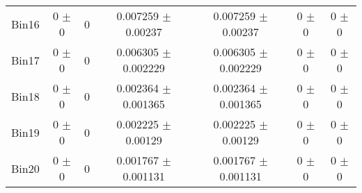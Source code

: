 \begin{tabular}{@{\extracolsep{4pt}}lcccccc@{}}
     Bin16 & 0 $\pm$ 0 & 0 & 0.007259 $\pm$ 0.00237 & 0.007259 $\pm$ 0.00237 & 0 $\pm$ 0 & 0 $\pm$ 0 \\ 
     Bin17 & 0 $\pm$ 0 & 0 & 0.006305 $\pm$ 0.002229 & 0.006305 $\pm$ 0.002229 & 0 $\pm$ 0 & 0 $\pm$ 0 \\ 
     Bin18 & 0 $\pm$ 0 & 0 & 0.002364 $\pm$ 0.001365 & 0.002364 $\pm$ 0.001365 & 0 $\pm$ 0 & 0 $\pm$ 0 \\ 
     Bin19 & 0 $\pm$ 0 & 0 & 0.002225 $\pm$ 0.00129 & 0.002225 $\pm$ 0.00129 & 0 $\pm$ 0 & 0 $\pm$ 0 \\ 
     Bin20 & 0 $\pm$ 0 & 0 & 0.001767 $\pm$ 0.001131 & 0.001767 $\pm$ 0.001131 & 0 $\pm$ 0 & 0 $\pm$ 0 \\ 
\hline\hline
  \end{tabular}
